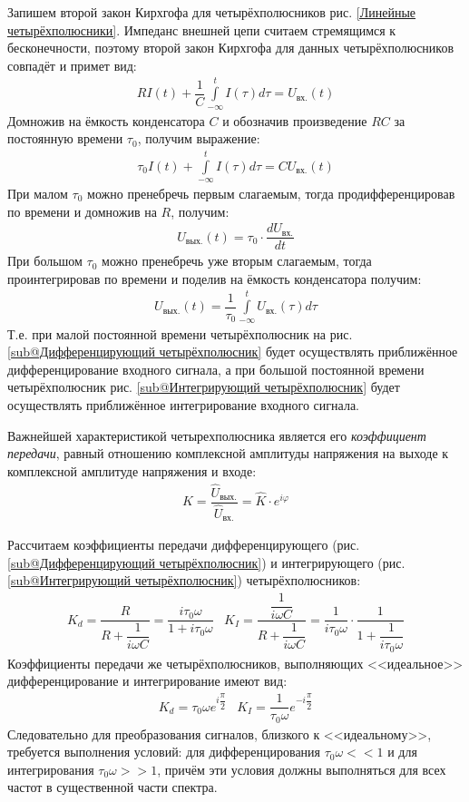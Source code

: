 \documentclass[a4paper]{article}
\begin{document}
Запишем второй закон Кирхгофа для четырёхполюсников рис. \ref{Линейные четырёхполюсники}.
Импеданс внешней цепи считаем стремящимся к бесконечности,
поэтому второй закон Кирхгофа для данных четырёхполюсников совпадёт и примет вид:
\begin{gather*}
    RI(t) + \dfrac{1}{C}\int\limits_{-\infty}^{t}I(\tau)d\tau = U_\text{вх.}(t)
\end{gather*}
Домножив на ёмкость конденсатора $C$ и обозначив произведение $RC$
за постоянную времени $\tau_0$, получим выражение:
\begin{gather*}
    \tau_0 I(t) + \int\limits_{-\infty}^{t}I(\tau)d\tau = CU_\text{вх.}(t)
\end{gather*}
При малом $\tau_0$ можно пренебречь первым слагаемым,
тогда продифференцировав по времени и домножив на $R$,
получим:
\begin{gather*}
    U_\text{вых.}(t) = \tau_0 \cdot \dfrac{dU_\text{вх.}}{dt}
\end{gather*}
При большом $\tau_0$ можно пренебречь уже вторым слагаемым,
тогда проинтегрировав по времени и поделив на ёмкость конденсатора
получим:
\begin{gather*}
    U_\text{вых.}(t) = \dfrac{1}{\tau_0}\int\limits_{-\infty}^{t}U_\text{вх.}(\tau)d\tau
\end{gather*}
Т.е. при малой постоянной времени четырёхполюсник на рис. \ref{sub@Дифференцирующий четырёхполюсник}
будет осуществлять приближённое дифференцирование входного сигнала,
а при большой постоянной времени четырёхполюсник рис. \ref{sub@Интегрирующий четырёхполюсник}
будет осуществлять приближённое интегрирование входного сигнала.

Важнейшей характеристикой четырехполюсника является его {\it коэффициент передачи},
равный отношению комплексной амплитуды напряжения на выходе к комплексной
амплитуде напряжения и входе:
\begin{gather*}
    K = \dfrac{\hat{U}_\text{вых.}}{\hat{U}_\text{вх.}} = \hat{K} \cdot e^{i\varphi}
\end{gather*}

Рассчитаем коэффициенты передачи дифференцирующего (рис. \ref{sub@Дифференцирующий четырёхполюсник})
и интегрирующего (рис. \ref{sub@Интегрирующий четырёхполюсник}) четырёхполюсников:
\begin{eqnarray*}
    K_d = \dfrac{R}{R + \dfrac{1}{i\omega C}} = \dfrac{i\tau_0\omega}{1 + i\tau_0\omega} & K_I = \dfrac{\dfrac{1}{i\omega C}}{R + \dfrac{1}{i\omega C}} = \dfrac{1}{i\tau_0\omega} \cdot \dfrac{1}{1 + \dfrac{1}{i\tau_0\omega}}
\end{eqnarray*}
Коэффициенты передачи же четырёхполюсников, выполняющих <<идеальное>>
дифференцирование и интегрирование имеют вид:
\begin{eqnarray*}
    K_d = \tau_0\omega e^{i\dfrac{\pi}{2}} & K_I = \dfrac{1}{\tau_0\omega}e^{-i\dfrac{\pi}{2}}
\end{eqnarray*}
Следовательно для преобразования сигналов, близкого к <<идеальному>>,
требуется выполнения условий:
для дифференцирования $\tau_0\omega << 1$ и для интегрирования $\tau_0\omega >> 1$,
причём эти условия должны выполняться для всех частот в существенной части спектра.
\end{document}
